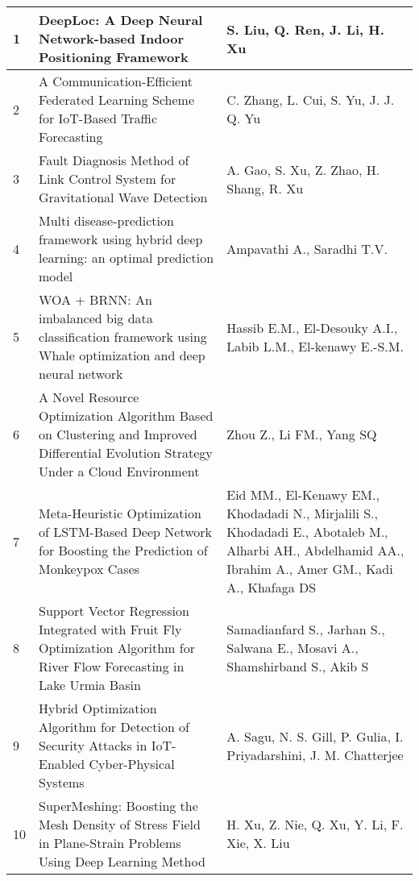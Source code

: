 \begin{landscape}
\begin{longtable}{|p{0.5cm}|p{9cm}|p{7cm}|}
    1 & DeepLoc: A Deep Neural Network-based Indoor Positioning Framework & S. Liu, Q. Ren, J. Li, H. Xu \\
    \hline
    2 & A Communication-Efficient Federated Learning Scheme for IoT-Based Traffic Forecasting & C. Zhang, L. Cui, S. Yu, J. J. Q. Yu \\
    \hline
    3 & Fault Diagnosis Method of Link Control System for Gravitational Wave Detection & A. Gao, S. Xu, Z. Zhao, H. Shang, R. Xu \\
    \hline
    4 & Multi disease-prediction framework using hybrid deep learning: an optimal prediction model & Ampavathi A., Saradhi T.V. \\
    \hline
    5 & WOA + BRNN: An imbalanced big data classification framework using Whale optimization and deep neural network & Hassib E.M., El-Desouky A.I., Labib L.M., El-kenawy E.-S.M. \\
    \hline
    6 & A Novel Resource Optimization Algorithm Based on Clustering and Improved Differential Evolution Strategy Under a Cloud Environment & Zhou Z., Li FM., Yang SQ \\
    \hline
    7 & Meta-Heuristic Optimization of LSTM-Based Deep Network for Boosting the Prediction of Monkeypox Cases & Eid MM., El-Kenawy EM., Khodadadi N., Mirjalili S., Khodadadi E., Abotaleb M., Alharbi AH., Abdelhamid AA., Ibrahim A., Amer GM., Kadi A., Khafaga DS \\
    \hline
    8 & Support Vector Regression Integrated with Fruit Fly Optimization Algorithm for River Flow Forecasting in Lake Urmia Basin & Samadianfard S., Jarhan S., Salwana E., Mosavi A., Shamshirband S., Akib S \\
    \hline
    9 & Hybrid Optimization Algorithm for Detection of Security Attacks in IoT-Enabled Cyber-Physical Systems & A. Sagu, N. S. Gill, P. Gulia, I. Priyadarshini, J. M. Chatterjee \\
    \hline
    10 & SuperMeshing: Boosting the Mesh Density of Stress Field in Plane-Strain Problems Using Deep Learning Method & H. Xu, Z. Nie, Q. Xu, Y. Li, F. Xie, X. Liu \\


\end{longtable}
\end{landscape}
